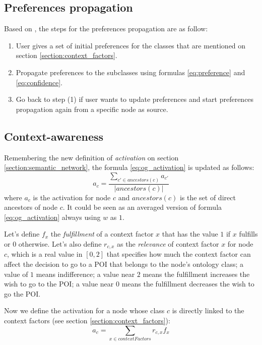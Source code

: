 \subsection{Preferences propagation} \label{section:preferences-propagation}
Based on \cite{bahramian_abbaspour_claramunt_2017}, the steps for the preferences propagation are as follow:
\begin{enumerate}
    \item User gives a set of initial preferences for the classes that are mentioned on section \ref{section:context_factors}.
    
    \item Propagate preferences to the subclasses using formulas \ref{eq:preference} and \ref{eq:confidence}.
    
    \item Go back to step (1) if user wants to update preferences and start preferences propagation again from a specific node as source.
\end{enumerate}

\subsection{Context-awareness} \label{section:context-awareness}
Remembering the new definition of \textit{activation} on section \ref{section:semantic_network}, the formula \ref{eq:og_activation} is updated as follows:
\begin{equation} \label{eq:activation}
    a_{c} = \frac{\displaystyle \sum_{c' \in ancestors(c)} a_{c'}}{|ancestors(c)|}
\end{equation}
where $a_c$ is the activation for node $c$ and $ancestors(c)$ is the set of direct ancestors of node $c$. It could be seen as an averaged version of formula \ref{eq:og_activation} always using $w$ as $1$.

Let's define $f_x$ the \textit{fulfillment} of a context factor $x$ that has the value $1$ if $x$ fulfills or $0$ otherwise. Let's also define $r_{c,x}$ as the \textit{relevance} of context factor $x$ for node $c$, which is a real value in $[0, 2]$ that specifies how much the context factor can affect the decision to go to a POI that belongs to the node's ontology class; a value of $1$ means indifference; a value near $2$ means the fulfillment increases the wish to go to the POI; a value near $0$ means the fulfillment decreases the wish to go the POI. 

Now we define the activation for a node whose class $c$ is directly linked to the context factors (see section \ref{section:context_factors}):
\begin{equation} \label{eq:high_activation}
    a_c = \sum_{x \in contextFactors} r_{c,x} f_x
\end{equation}

